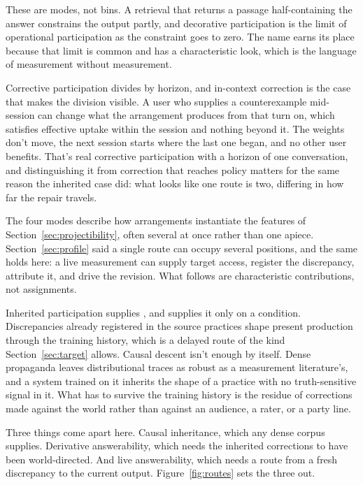 \documentclass[12pt]{article}
\begin{document}
These are modes, not bins. A retrieval that returns a passage half-containing the answer
constrains the output partly, and decorative participation is the limit of operational
participation as the constraint goes to zero. The name earns its place because that limit
is common and has a characteristic look, which is the language of measurement without
measurement.

Corrective participation divides by horizon, and in-context correction is the case that
makes the division visible. A user who supplies a counterexample mid-session can change
what the arrangement produces from that turn on, which satisfies effective uptake
within the session and nothing beyond it. The weights don't move, the next session starts
where the last one began, and no other user benefits. That's real corrective
participation with a horizon of one conversation, and distinguishing it from correction
that reaches policy matters for the same reason the inherited case did: what looks like
one route is two, differing in how far the repair travels.

The four modes describe how arrangements instantiate the features of
Section~\ref{sec:projectibility}, often several at once rather than one apiece.
Section~\ref{sec:profile} said a single route can occupy several positions, and the same
holds here: a live measurement can supply target access, register the discrepancy, attribute
it, and drive the revision. What follows are characteristic contributions, not assignments.

Inherited participation supplies , and supplies it only on a
condition. Discrepancies already registered in the source practices shape present
production through the training history, which is a delayed route of the kind
Section~\ref{sec:target} allows. Causal descent isn't enough by itself. Dense propaganda
leaves distributional traces as robust as a measurement literature's, and a system trained
on it inherits the shape of a practice with no truth-sensitive signal in it. What has to
survive the training history is the residue of corrections made against the world rather
than against an audience, a rater, or a party line.

Three things come apart here. Causal inheritance, which any dense corpus supplies.
Derivative answerability, which needs the inherited corrections to have been
world-directed. And live answerability, which needs a route from a fresh discrepancy to the
current output. Figure~\ref{fig:routes} sets the three out.
\end{document}
